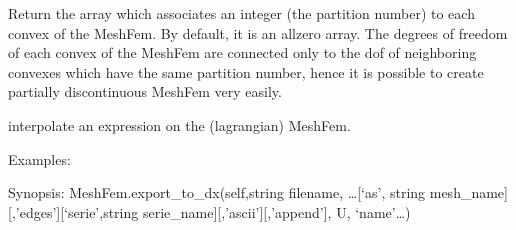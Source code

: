 \documentclass[a4paper,11pt,english]{sphinxmanual}
\begin{document}
\begin{fulllineitems}
\begin{fulllineitems}
Return the array which associates an integer (the partition number)
to each convex of the MeshFem. By default, it is an all\sphinxhyphen{}zero array.
The degrees of freedom of each convex of the MeshFem are connected
only to the dof of neighboring convexes which have the same
partition number, hence it is possible to create partially
discontinuous MeshFem very easily.

\end{fulllineitems}


\begin{fulllineitems}
\label{\detokenize{python/cmdref_MeshFem:getfem.MeshFem.eval}}
interpolate an expression on the (lagrangian) MeshFem.

Examples:

\begin{sphinxVerbatim}[commandchars=\\\{\}]
 
 

   
 
\end{sphinxVerbatim}

\end{fulllineitems}


\begin{fulllineitems}
\label{\detokenize{python/cmdref_MeshFem:getfem.MeshFem.export_to_dx}}
Synopsis: MeshFem.export\_to\_dx(self,string filename, …{[}‘as’, string mesh\_name{]}{[},’edges’{]}{[}‘serie’,string serie\_name{]}{[},’ascii’{]}{[},’append’{]}, U, ‘name’…)


\end{fulllineitems}
\end{fulllineitems}
\end{document}
